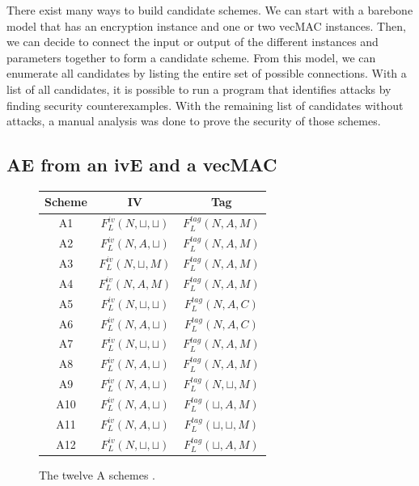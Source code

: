 \documentclass[10pt,a4paper]{article}
\begin{document}
There exist many ways to build candidate schemes. 
We can start with a barebone model that has an encryption instance and one or two vecMAC instances.
Then, we can decide to connect the input or output of the different instances and parameters together to form a candidate scheme.
From this model, we can enumerate all candidates by listing the entire set of possible connections.
With a list of all candidates, it is possible to run a program that identifies attacks by finding security counterexamples.
With the remaining list of candidates without attacks, a manual analysis was done to prove the security of those schemes.

\subsection{AE from an ivE and a vecMAC}

\begin{figure}
\begin{center}
\begin{tabular}{ | c | c | c | }
	\hline
	Scheme & IV & Tag \\ \hline
	A1 & $F^{iv}_L(N,\sqcup,\sqcup)$ & $F^{tag}_L(N, A, M)$ \\ \hline
	A2 & $F^{iv}_L(N,A,\sqcup)$ & $F^{tag}_L(N, A, M)$ \\ \hline
	A3 & $F^{iv}_L(N,\sqcup,M)$ & $F^{tag}_L(N, A, M)$ \\ \hline
	A4 & $F^{iv}_L(N,A,M)$ & $F^{tag}_L(N, A, M)$ \\ \hline
	A5 & $F^{iv}_L(N,\sqcup,\sqcup)$ & $F^{tag}_L(N, A, C)$ \\ \hline
	A6 & $F^{iv}_L(N,A,\sqcup)$ & $F^{tag}_L(N, A, C)$ \\ \hline
	A7 & $F^{iv}_L(N,\sqcup,\sqcup)$ & $F^{tag}_L(N, A, M)$ \\ \hline
	A8 & $F^{iv}_L(N,A,\sqcup)$ & $F^{tag}_L(N, A, M)$ \\ \hline
	\hline
	A9 & $F^{iv}_L(N,A,\sqcup)$ & $F^{tag}_L(N, \sqcup, M)$ \\ \hline
	\hline
	A10 & $F^{iv}_L(N,A,\sqcup)$ & $F^{tag}_L(\sqcup, A, M)$ \\ \hline
	A11 & $F^{iv}_L(N,A,\sqcup)$ & $F^{tag}_L(\sqcup,\sqcup, M)$ \\ \hline
	A12 & $F^{iv}_L(N,\sqcup,\sqcup)$ & $F^{tag}_L(\sqcup, A, M)$ \\ \hline
\end{tabular}
\end{center}
	\caption{The twelve A schemes \cite{namprempre2014reconsidering}.\label{fig:aschemes}}
\end{figure}
\end{document}
